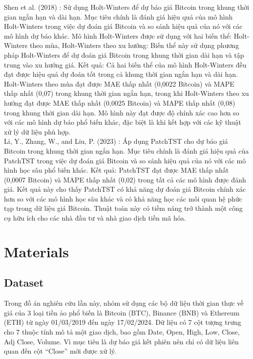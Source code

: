 \documentclass[conference]{IEEEtran}
\begin{document}
Shen et al. (2018) \cite{b11}: Sử dụng Holt-Winters để dự báo giá Bitcoin trong khung thời gian ngắn hạn và dài hạn. Mục tiêu chính là đánh giá hiệu quả của mô hình Holt-Winters trong việc dự đoán giá Bitcoin và so sánh hiệu quả của nó với các mô hình dự báo khác. Mô hình Holt-Winters được sử dụng với hai biến thể: Holt-Winters theo mùa, Holt-Winters theo xu hướng: Biến thể này sử dụng phương pháp Holt-Winters để dự đoán giá Bitcoin trong khung thời gian dài hạn và tập trung vào xu hướng giá. Kết quả: Cả hai biến thể của mô hình Holt-Winters đều đạt được hiệu quả dự đoán tốt trong cả khung thời gian ngắn hạn và dài hạn. Holt-Winters theo mùa đạt được MAE thấp nhất (0,0022 Bitcoin) và MAPE thấp nhất (0,07) trong khung thời gian ngắn hạn, trong khi Holt-Winters theo xu hướng đạt được MAE thấp nhất (0,0025 Bitcoin) và MAPE thấp nhất (0,08) trong khung thời gian dài hạn. Mô hình này đạt được độ chính xác cao hơn so với các mô hình dự báo phổ biến khác, đặc biệt là khi kết hợp với các kỹ thuật xử lý dữ liệu phù hợp. \\

Li, Y., Zhang, W., and Liu, P. (2023) \cite{b12}: Áp dụng PatchTST cho dự báo giá Bitcoin trong khung thời gian ngắn hạn. Mục tiêu chính là đánh giá hiệu quả của PatchTST trong việc dự đoán giá Bitcoin và so sánh hiệu quả của nó với các mô hình học sâu phổ biến khác. Kết quả: PatchTST đạt được MAE thấp nhất (0,0007 Bitcoin) và MAPE thấp nhất (0,02) trong tất cả các mô hình được đánh giá. Kết quả này cho thấy PatchTST có khả năng dự đoán giá Bitcoin chính xác hơn so với các mô hình học sâu khác và có khả năng học các mối quan hệ phức tạp trong dữ liệu giá Bitcoin. Thuật toán này có tiềm năng trở thành một công cụ hữu ích cho các nhà đầu tư và nhà giao dịch tiền mã hóa.


\section{Materials}
\subsection{Dataset}

Trong đồ án nghiên cứu lần này, nhóm sử dụng các bộ dữ liệu thời gian thực về giá của 3 loại tiền ảo phổ biến là Bitcoin (BTC), Binance (BNB) và Ethereum (ETH) từ ngày 01/03/2019 đến ngày 17/02/2024. Dữ liệu có 7 cột tượng trưng cho 7 thuộc tính mô tả một giao dịch, bao gồm Date, Open, High, Low, Close, Adj Close, Volume. Vì mục tiêu là dự báo giá kết phiên nên chỉ có dữ liệu liên quan đến cột “Close” mới được xử lý.
\end{document}
